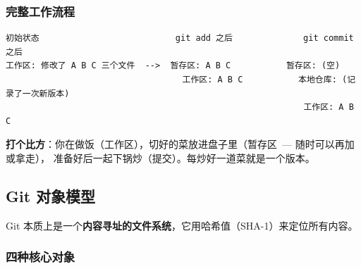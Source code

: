 \documentclass[12pt,a4paper]{article}
\begin{document}
\subsubsection{完整工作流程}

\begin{lstlisting}[numbers=none]
初始状态                           git add 之后              git commit 之后
工作区: 修改了 A B C 三个文件  -->  暂存区: A B C           暂存区: (空)
                                   工作区: A B C           本地仓库: (记录了一次新版本)
                                                           工作区: A B C
\end{lstlisting}

\textbf{打个比方}：你在做饭（工作区），切好的菜放进盘子里（暂存区\ --- 随时可以再加或拿走），
准备好后一起下锅炒（提交）。每炒好一道菜就是一个版本。

\subsection{Git 对象模型}

Git 本质上是一个\textbf{内容寻址的文件系统}，它用哈希值（SHA-1）来定位所有内容。

\subsubsection{四种核心对象}
\end{document}
